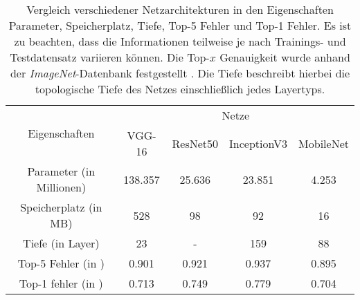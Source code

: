 \begin{table}[H]
	\caption{Vergleich verschiedener Netzarchitekturen in den Eigenschaften Parameter, Speicherplatz, Tiefe, Top-5 Fehler und Top-1 Fehler. Es ist zu beachten, dass die Informationen teilweise je nach Trainings- und Testdatensatz variieren können. Die Top-$x$ Genauigkeit wurde anhand der \textit{ImageNet}-Datenbank festgestellt \cite{keras}. Die Tiefe beschreibt hierbei die topologische Tiefe des Netzes einschließlich jedes Layertyps\cite{keras}.}
	\begin{center}
		\begin{tabular}{|c|c|c|c|c|}
			\hline
			\multirow{2}{*}{Eigenschaften}& \multicolumn{4}{c|}{\centering Netze} \\
			\cline{2-5} & \multicolumn{1}{c|}{VGG-16} & \multicolumn{1}{c|}{ResNet50} & \multicolumn{1}{c|}{InceptionV3} & \multicolumn{1}{c|}{MobileNet} \\ \hline
			Parameter (in Millionen)	& 138.357 	& 25.636 	& 23.851 	& 4.253 \\
			Speicherplatz (in MB)		& 528 		& 98 		& 92 		& 16 \\
			Tiefe (in Layer) 			& 23 		& -			& 159 		& 88 \\
			Top-5 Fehler (in \percent)	& 0.901 	& 0.921 	& 0.937		& 0.895 \\
			Top-1 fehler (in \percent) 	& 0.713 	& 0.749 	& 0.779		& 0.704 \\
			\hline
		\end{tabular}
	\end{center}

	\label{fig: cnnvergleich}
\end{table}